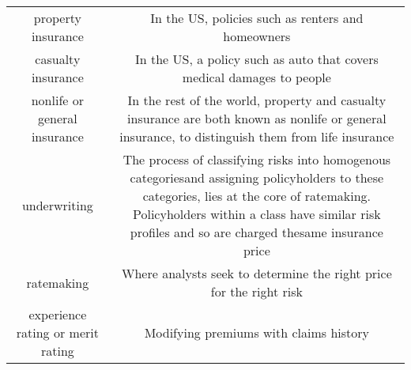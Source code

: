 \documentclass[]{book}
\theoremstyle{definition}
\theoremstyle{definition}
\theoremstyle{definition}
\theoremstyle{remark}
\begin{document}
\begin{longtable}[]{@{}cc@{}}
\begin{minipage}[t]{0.41\columnwidth}\centering\strut
property insurance\strut
\end{minipage} & \begin{minipage}[t]{0.42\columnwidth}\centering\strut
In the US, policies such as renters and homeowners\strut
\end{minipage}\tabularnewline
\begin{minipage}[t]{0.41\columnwidth}\centering\strut
casualty insurance\strut
\end{minipage} & \begin{minipage}[t]{0.42\columnwidth}\centering\strut
In the US, a policy such as auto that covers medical damages to
people\strut
\end{minipage}\tabularnewline
\begin{minipage}[t]{0.41\columnwidth}\centering\strut
nonlife or general insurance\strut
\end{minipage} & \begin{minipage}[t]{0.42\columnwidth}\centering\strut
In the rest of the world, property and casualty insurance are both known
as nonlife or general insurance, to distinguish them from life
insurance\strut
\end{minipage}\tabularnewline
\begin{minipage}[t]{0.41\columnwidth}\centering\strut
underwriting\strut
\end{minipage} & \begin{minipage}[t]{0.42\columnwidth}\centering\strut
The process of classifying risks into homogenous categoriesand assigning
policyholders to these categories, lies at the core of ratemaking.
Policyholders within a class have similar risk profiles and so are
charged thesame insurance price\strut
\end{minipage}\tabularnewline
\begin{minipage}[t]{0.41\columnwidth}\centering\strut
ratemaking\strut
\end{minipage} & \begin{minipage}[t]{0.42\columnwidth}\centering\strut
Where analysts seek to determine the right price for the right
risk\strut
\end{minipage}\tabularnewline
\begin{minipage}[t]{0.41\columnwidth}\centering\strut
experience rating or merit rating\strut
\end{minipage} & \begin{minipage}[t]{0.42\columnwidth}\centering\strut
Modifying premiums with claims history\strut

\end{minipage}
\end{longtable}
\end{document}
